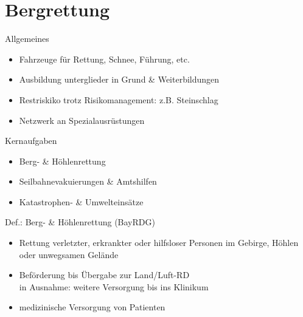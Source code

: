 \section{Bergrettung}
\begin{sectionbox}{Allgemeines}
    \begin{itemize}
        \item Fahrzeuge für Rettung, Schnee, Führung, etc. 
        \item Ausbildung unterglieder in Grund \& Weiterbildungen
        \item Restriskiko trotz Risikomanagement: z.B. Steinschlag
        \item Netzwerk an Spezialausrüstungen
    \end{itemize}
\end{sectionbox}
\begin{sectionbox}{Kernaufgaben}
    \begin{itemize}
        \item Berg- \& Höhlenrettung
        \item Seilbahnevakuierungen \& Amtshilfen
        \item Katastrophen- \& Umwelteinsätze 
    \end{itemize}
\end{sectionbox}
\begin{warningbox}{Def.: Berg- \& Höhlenrettung (BayRDG)}
    \begin{itemize}
        \item Rettung verletzter, erkrankter oder hilfsloser Personen im Gebirge, Höhlen oder unwegsamen Gelände
        \item Beförderung bis Übergabe zur Land/Luft-RD\\
        \ra in Ausnahme: weitere Versorgung bis ins Klinikum
        \item medizinische Versorgung von Patienten
    \end{itemize}
\end{warningbox}